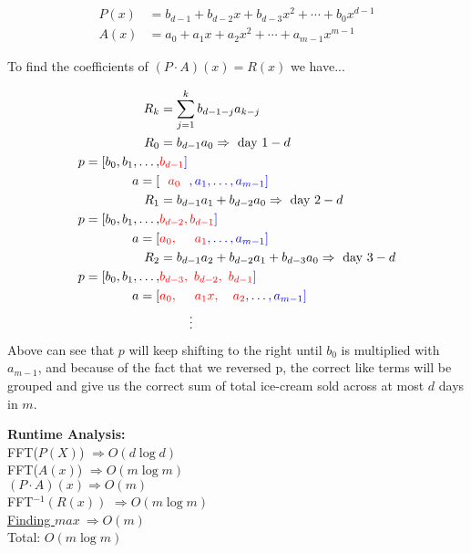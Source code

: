 \documentclass[11pt]{article}
\begin{document}
\begin{solution}
\begin{center}
        \end{center}
        \begin{align*}
            P(x) &= b_{d-1} + b_{d-2}x + b_{d-3}x^2 + \cdots + b_0x^{d-1}\\
            A(x) &= a_0 + a_1x + a_2x^2 + \cdots + a_{m-1}x^{m-1}
        \end{align*}
        \begin{center}
            To find the coefficients of $(P\cdot A)(x) = R(x) $ we have...
        \end{center}
        \begin{align*}
            R_k &= \sum_{j = 1}^{k}b_{d-1-j}a_{k-j}\\
            R_0 &= b_{d-1}a_0 \Rightarrow \text{ day }1-d\\
            p = [b_0, b_1, \dots, &\color{red}b_{d-1}\color{blue}]\\
            a = [&\color{red}~~a_0~~\color{blue}, a_1, \dots, a_{m-1}]\\
            R_1 &= b_{d-1}a_1 + b_{d-2}a_0 \Rightarrow \text{ day }2-d\\
            p = [b_0, b_1, \dots, &\color{red}b_{d-2}, b_{d-1}\color{blue}]\\
            a = [&\color{red}a_0, ~~~~a_1\color{blue}, \dots, a_{m-1}]\\
            R_2 &= b_{d-1}a_2 + b_{d-2}a_1 + b_{d-3}a_0 \Rightarrow \text{ day }3-d\\
            p = [b_0, b_1, \dots, &\color{red}b_{d-3}, ~b_{d-2}, ~b_{d-1}\color{blue}]\\
            a = [&\color{red}a_0, ~~~~a_1x, ~~~a_2\color{blue}, \dots, a_{m-1}]\\
            &~~~~~~~\vdots
        \end{align*}
        Above can see that $p$ will keep shifting to the right until $b_0$ is multiplied with $a_{m-1}$, and because of the fact that we reversed p, the correct like terms will be grouped and give us the correct sum of total ice-cream sold across 
        at most $d$ days in $m$.
        \begin{center}
            \textbf{Runtime Analysis: }\\
            FFT($P(X)$) $\Rightarrow O(d\log d)$\\
            FFT($A(x)$) $\Rightarrow O(m\log m)$\\
            $(P\cdot A)(x) \Rightarrow O(m)$\\
            FFT$^{-1}(R(x))$ $\Rightarrow O(m\log m)$\\
            \underline{Finding $max~\Rightarrow O(m)$}\\
            Total: $O(m\log m)$
        \end{center}
    \end{solution}
\end{document}
